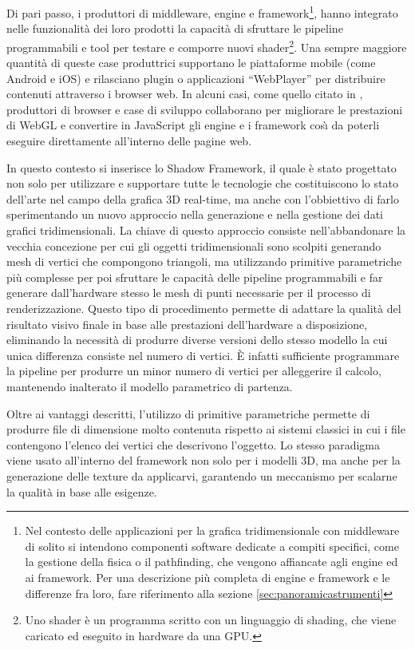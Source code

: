 Di pari passo, i produttori di middleware, engine e framework\footnote{Nel contesto delle applicazioni per la grafica tridimensionale con middleware di solito si intendono componenti software dedicate a compiti specifici, come la gestione della fisica o il pathfinding, che vengono affiancate agli engine ed ai framework. Per una descrizione pi\`u completa di engine e framework e le differenze fra loro, fare riferimento alla sezione \ref{sec:panoramicastrumenti}}, hanno integrato nelle funzionalit\`a dei loro prodotti la capacit\`a di sfruttare le pipeline programmabili e tool per testare e comporre nuovi shader\footnote{Uno shader \`e un programma scritto con un linguaggio di shading, che viene caricato ed eseguito in hardware da una \ac{GPU}.}. Una sempre maggiore quantit\`a di queste case produttrici supportano le piattaforme mobile (come Android e iOS) e rilasciano plugin o applicazioni ``WebPlayer'' per distribuire contenuti attraverso i browser web. 
In alcuni casi, come quello citato in \cite{site:mozillaunrealannounce}, produttori di browser e case di sviluppo collaborano per migliorare le prestazioni di WebGL e convertire in JavaScript gli engine e i framework cos{\`\i} da poterli eseguire direttamente all'interno delle pagine web.

In questo contesto si inserisce lo Shadow Framework, il quale \`e stato progettato non solo per utilizzare e supportare tutte le tecnologie che costituiscono lo stato dell'arte nel campo della grafica 3D real-time, ma anche con l'obbiettivo di farlo sperimentando un nuovo approccio nella generazione e nella gestione dei dati grafici tridimensionali. 
La chiave di questo approccio consiste nell'abbandonare la vecchia concezione per cui gli oggetti tridimensionali sono scolpiti generando mesh di vertici che compongono triangoli, ma utilizzando primitive parametriche pi\`u complesse per poi sfruttare le capacit\`a delle pipeline programmabili e far generare dall'hardware stesso le mesh di punti necessarie per il processo di renderizzazione.
Questo tipo di procedimento permette di adattare la qualit\`a  del risultato visivo finale in base alle prestazioni dell'hardware a disposizione, eliminando la necessit\`a di produrre diverse versioni dello stesso modello la cui unica differenza consiste nel numero di vertici. \`E infatti sufficiente programmare la pipeline per produrre un minor numero di vertici per alleggerire il calcolo, mantenendo inalterato il modello parametrico di partenza.

Oltre ai vantaggi descritti, l'utilizzo di primitive parametriche permette di produrre file di dimensione molto contenuta rispetto ai sistemi classici in cui i file contengono l'elenco dei vertici che descrivono l'oggetto. Lo stesso paradigma viene usato all'interno del framework non solo per i modelli 3D, ma anche per la generazione delle texture da applicarvi, garantendo un meccanismo per scalarne la qualit\`a in base alle esigenze.

